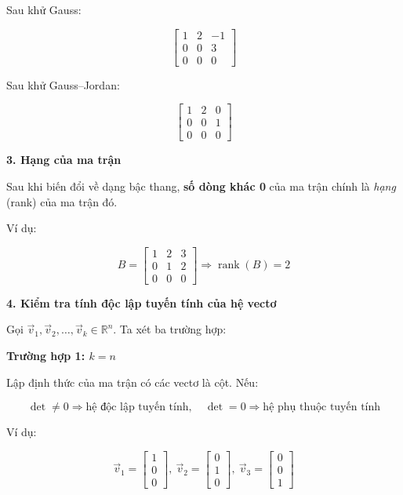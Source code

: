 \documentclass[12pt]{article}
\begin{document}
Sau khử Gauss:

\[
\begin{bmatrix} 1 & 2 & -1 \\ 0 & 0 & 3 \\ 0 & 0 & 0 \end{bmatrix}
\]

Sau khử Gauss–Jordan:

\[
\begin{bmatrix} 1 & 2 & 0 \\ 0 & 0 & 1 \\ 0 & 0 & 0 \end{bmatrix}
\]

\vspace{1em}
\textbf{3. Hạng của ma trận}

Sau khi biến đổi về dạng bậc thang, \textbf{số dòng khác 0} của ma trận chính là \textit{hạng} (rank) của ma trận đó.

Ví dụ:

\[
B = \begin{bmatrix} 1 & 2 & 3 \\ 0 & 1 & 2 \\ 0 & 0 & 0 \end{bmatrix}
\Rightarrow \operatorname{rank}(B) = 2
\]

\vspace{1em}
\textbf{4. Kiểm tra tính độc lập tuyến tính của hệ vectơ}

Gọi \( \vec{v}_1, \vec{v}_2, \ldots, \vec{v}_k \in \mathbb{R}^n \). Ta xét ba trường hợp:

\textbf{Trường hợp 1: \( k = n \)}

Lập định thức của ma trận có các vectơ là cột. Nếu:

\[
\det \neq 0 \Rightarrow \text{hệ độc lập tuyến tính}, \quad \det = 0 \Rightarrow \text{hệ phụ thuộc tuyến tính}
\]

Ví dụ:

\[
\vec{v}_1 = \begin{bmatrix} 1 \\ 0 \\ 0 \end{bmatrix},\ 
\vec{v}_2 = \begin{bmatrix} 0 \\ 1 \\ 0 \end{bmatrix},\ 
\vec{v}_3 = \begin{bmatrix} 0 \\ 0 \\ 1 \end{bmatrix}
\]
\end{document}
